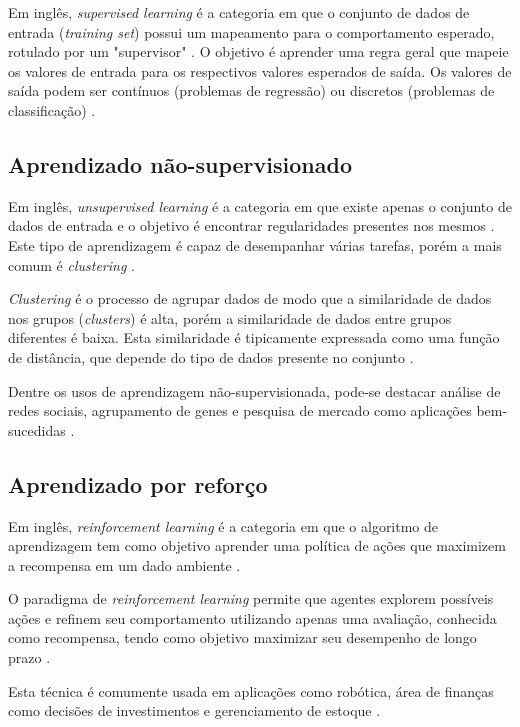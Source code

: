 Em inglês, \textit{supervised learning} é a categoria em que o conjunto de dados de entrada (\textit{training set}) possui um mapeamento para o comportamento esperado, rotulado por um "supervisor" \cite{alpaydin2020introduction}. O objetivo é aprender uma regra geral que mapeie os valores de entrada para os respectivos valores esperados de saída. Os valores de saída podem ser contínuos (problemas de regressão) ou discretos (problemas de classificação) \cite{8527529}.

\subsection{Aprendizado não-supervisionado}

Em inglês, \textit{unsupervised learning} é a categoria em que existe apenas o conjunto de dados de entrada e o objetivo é encontrar regularidades presentes nos mesmos \cite{alpaydin2020introduction}. Este tipo de aprendizagem é capaz de desempanhar várias tarefas, porém a mais comum é \textit{clustering} \cite{8527529}.

\textit{Clustering} é o processo de agrupar dados de modo que a similaridade de dados nos grupos (\textit{clusters}) é alta, porém a similaridade de dados entre grupos diferentes é baixa. Esta similaridade é tipicamente expressada como uma função de distância, que depende do tipo de dados presente no conjunto \cite{8527529}.

Dentre os usos de aprendizagem não-supervisionada, pode-se destacar análise de redes sociais, agrupamento de genes e pesquisa de mercado como aplicações bem-sucedidas \cite{8527529}.

\subsection{Aprendizado por reforço}

Em inglês, \textit{reinforcement learning} é a categoria em que o algoritmo de aprendizagem tem como objetivo aprender uma política de ações que maximizem a recompensa em um dado ambiente \cite{alpaydin2020introduction}.

O paradigma de \textit{reinforcement learning} permite que agentes explorem possíveis ações e refinem seu comportamento utilizando apenas uma avaliação, conhecida como recompensa, tendo como objetivo maximizar seu desempenho de longo prazo \cite{8527529}.

Esta técnica é comumente usada em aplicações como robótica, área de finanças como decisões de investimentos e gerenciamento de estoque \cite{8527529}.

